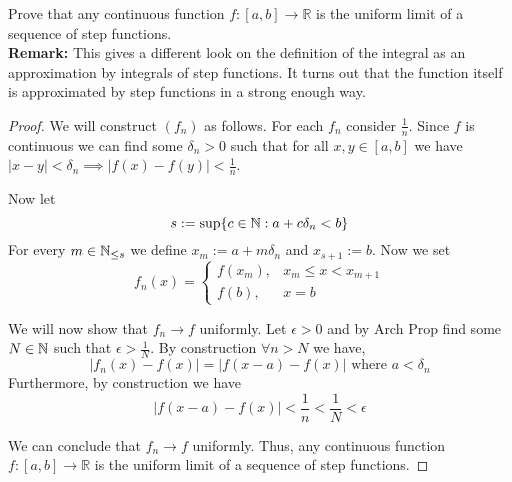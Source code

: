 \documentclass{exam}
\begin{document}
\begin{rating}
\end{rating}

\begin{problem}
\end{problem}

\begin{mybox}
  
  Prove that any continuous function $f : [a, b] \rightarrow 
  \mathbb{R}$ is the uniform limit of a sequence of step functions.
  \\

  \textbf{Remark:} This gives a different look on the definition of
  the integral as an approximation by integrals of step functions.
  It turns out that the function itself is approximated by step
  functions in a strong enough way.

\end{mybox}

\begin{proof}
  We will construct $(f_n)$ as follows. For each $f_n$ consider
  $\frac{1}{n}$. Since $f$ is continuous we can find some 
  $\delta_n >0$ such that for all $x,y\in [a,b]$ we have 
  $|x-y|<\delta_n \implies |f(x)-f(y)| <\frac{1}{n}$.

  Now let $$s := \sup\{c\in\mathbb{N} : a+c\delta_n<b\}$$ For every 
  $m\in\mathbb{N}_{\leq s}$ we define $x_m := a+ m\delta_n$ and $x_{s+1}:= b$.
  Now we set $$f_n(x) = \begin{cases}f(x_m), & x_m \leq x < x_{m+1} \\
  f(b), & x=b \end{cases}$$

  We will now show that $f_n \rightarrow f$ uniformly. Let 
  $\epsilon >0$ and by Arch Prop find some $N\in\mathbb{N}$ such that 
  $\epsilon > \frac{1}{N}$. By construction $\forall n>N$ we have, 
  $$|f_n(x) - f(x)| = |f(x-a)-f(x)| \text{ where } a<\delta_n$$ 
  Furthermore, by construction we have $$|f(x-a)-f(x)| < \frac{1}{n} 
  < \frac{1}{N} < \epsilon$$

  We can conclude that $f_n \rightarrow f$ uniformly. Thus, any
  continuous function $f : [a, b] \rightarrow \mathbb{R}$ is the
  uniform limit of a sequence of step functions.
\end{proof}

\begin{rating}
\end{rating}

\pagebreak

\begin{problem}
\end{problem}
\end{document}
